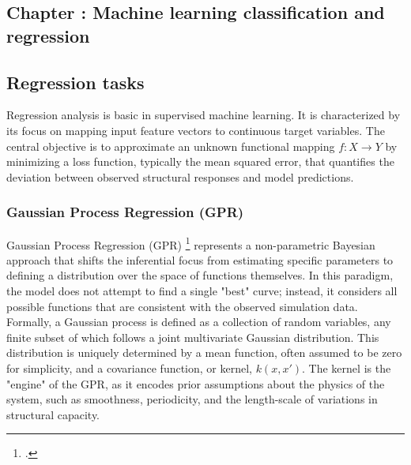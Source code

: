 \graphicspath{{figures_and_references/EELISA_conference/}}

\renewcommand{\chapternametext}{Chapter \thechapter: Machine learning classification and regression}
\renewcommand{\shortchapternametext}{Chapter \thechapter: Machine learning}

\begin{refsection}

\chapter{\chapternametext}

\renewcommand{\headingtextL}{}
\renewcommand{\headingtextR}{\shortchapternametext}
\begingroup
 \flushbottom
 \setlength{\parskip}{0pt plus 1fil}%
 \localtableofcontents 
\endgroup

\newpage
\setcounter{section}{0} 

\renewcommand{\sectionnametext}{Regression tasks}
\renewcommand{\headingtextL}{\shortchapternametext}
\renewcommand{\headingtextR}{\thesection. \sectionnametext}
\section{\sectionnametext}

Regression analysis is basic in supervised machine learning. It is characterized by its focus on mapping input feature vectors to continuous target variables. The central objective is to approximate an unknown functional mapping $f: X \rightarrow Y$ by minimizing a loss function, typically the mean squared error, that quantifies the deviation between observed structural responses and model predictions. 

\subsection{Gaussian Process Regression (GPR)}

Gaussian Process Regression (GPR) \footcite{rasmussen2003gaussian} represents a non-parametric Bayesian approach that shifts the inferential focus from estimating specific parameters to defining a distribution over the space of functions themselves. In this paradigm, the model does not attempt to find a single "best" curve; instead, it considers all possible functions that are consistent with the observed simulation data. Formally, a Gaussian process is defined as a collection of random variables, any finite subset of which follows a joint multivariate Gaussian distribution. This distribution is uniquely determined by a mean function, often assumed to be zero for simplicity, and a covariance function, or kernel, $k(x, x')$. The kernel is the "engine" of the GPR, as it encodes prior assumptions about the physics of the system, such as smoothness, periodicity, and the length-scale of variations in structural capacity.


\end{refsection}
